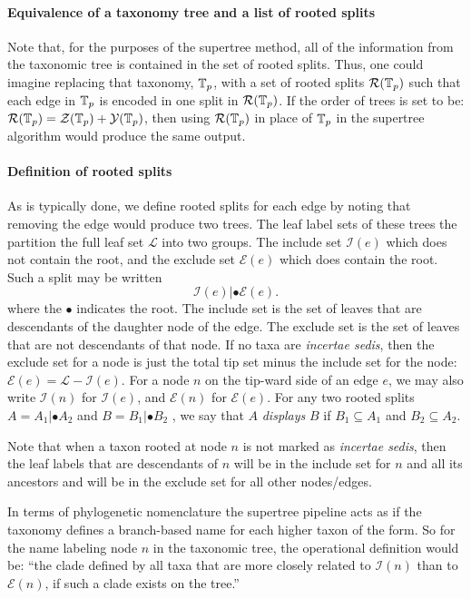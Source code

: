 \documentclass[english]{article}
\begin{document}
\paragraph{Equivalence of a taxonomy tree and a list of rooted splits}

Note that, for the purposes of the supertree method, all of the information from
the taxonomic tree is contained in the set of rooted splits. Thus, one could
imagine replacing that taxonomy, $\mbox{\ensuremath{\mathbb{T}}}_{p}$, with a set of rooted splits $\mathcal{R}(\mbox{\ensuremath{\mathbb{T}}}_{p})$ such that
each edge in $\mbox{\ensuremath{\mathbb{T}}}_{p}$ is encoded in one split in $\mathcal{R}(\mbox{\ensuremath{\mathbb{T}}}_{p})$. If the order of trees is set
to be: $\mathcal{R}(\mbox{\ensuremath{\mathbb{T}}}_{p})=\mathcal{Z}(\mbox{\ensuremath{\mathbb{T}}}_{p}) + 
\mathcal{Y}(\mbox{\ensuremath{\mathbb{T}}}_{p})$, then using $\mathcal{R}(\mbox{\ensuremath{\mathbb{T}}}_{p})$ in place of $\mbox{\ensuremath{\mathbb{T}}}_{p}$ in the supertree
algorithm would produce the same output.

\paragraph{Definition of rooted splits}
As is typically done, we define rooted splits for each edge by noting that
removing the edge would produce two trees. The leaf label sets of these trees
the partition the full leaf set $\mathcal{L}$ into two groups. The include set $\mathcal{I}(e)$ which
does not contain the root, and the exclude set $\mathcal{E}(e)$ which does contain the root.
Such a split may be written
\[ \mathcal{I}(e)|\bullet\mathcal{E}(e).\]
where the $\bullet$ indicates the root. The include set is the set of leaves that are
descendants of the daughter node of the edge. The exclude set is the set of
leaves that are not descendants of that node. If no taxa are \emph{incertae sedis},
then the exclude set for a node is just the total tip set minus the include set
for the node: $\mathcal{E}(e)  =\mathcal{L}-\mathcal{I}(e)$. For a node $n$ on the tip-ward side of an edge $e$, we
may also write $\mathcal{I}(n)$ for $\mathcal{I}(e)$, and $\mathcal{E}(n)$ for $\mathcal{E}(e)$. For any two rooted splits $A=A_{1}|\bullet A_{2}$
and $B=B_{1}|\bullet B_{2}$ , we say that $A$ \emph{displays }$B$ if $B_{1}\subseteq A_{1}$ and $B_{2}\subseteq A_{2}$.

Note that when a taxon rooted at node $n$ is not marked as \emph{incertae sedis},
then the leaf labels that are descendants of $n$ will be in the include set for
$n$ and all its ancestors and will be in the exclude set for all other nodes/edges.

In terms of phylogenetic nomenclature the supertree pipeline acts as if the
taxonomy defines a branch-based name \citep[see][]{deQueiroz2013} for each
higher taxon of the form. So for the name labeling node $n$ in the taxonomic
tree, the operational definition would be: ``the clade defined by all taxa that
are more closely related to $\mathcal{I}(n)$ than to $\mathcal{E}(n)$, if such a clade exists on the tree.''
\end{document}
